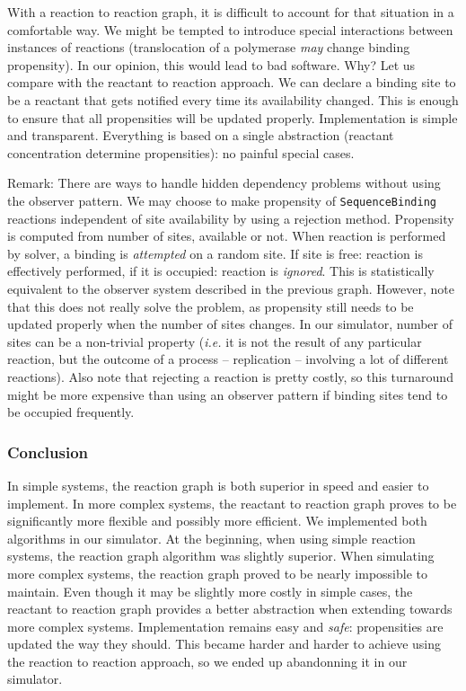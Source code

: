 With a reaction to reaction graph, it is difficult to account for that situation in a comfortable way. We might be tempted to introduce special interactions between instances of reactions (translocation of a polymerase \emph{may} change binding propensity). In our opinion, this would lead to bad software. Why? Let us compare with the reactant to reaction approach. We can declare a binding site to be a reactant that gets notified every time its availability changed. This is enough to ensure that all propensities will be updated properly. Implementation is simple and transparent. Everything is based on a single abstraction (reactant concentration determine propensities): no painful special cases.

\begin{footnotesize}
  Remark: There are ways to handle hidden dependency problems without using the observer pattern. We may choose to make propensity of \texttt{SequenceBinding} reactions independent of site availability by using a rejection method. Propensity is computed from number of sites, available or not. When reaction is performed by solver, a binding is \emph{attempted} on a random site. If site is free: reaction is effectively performed, if it is occupied: reaction is \emph{ignored}. This is statistically equivalent to the observer system described in the previous graph. However, note that this does not really solve the problem, as propensity still needs to be updated properly when the number of sites changes. In our simulator, number of sites can be a non-trivial property (\textit{i.e.} it is not the result of any particular reaction, but the outcome of a process -- replication -- involving a lot of different reactions). Also note that rejecting a reaction is pretty costly, so this turnaround might be more expensive than using an observer pattern if binding sites tend to be occupied frequently.
\end{footnotesize}

\subsubsection{Conclusion}

In simple systems, the reaction graph is both superior in speed and easier to implement. In more complex systems, the reactant to reaction graph proves to be significantly more flexible and possibly more efficient. We implemented both algorithms in our simulator. At the beginning, when using simple reaction systems, the reaction graph algorithm was slightly superior. When simulating more complex systems, the reaction graph proved to be nearly impossible to maintain. Even though it may be slightly more costly in simple cases, the reactant to reaction graph provides a better abstraction when extending towards more complex systems. Implementation remains easy and \emph{safe}: propensities are updated the way they should. This became harder and harder to achieve using the reaction to reaction approach, so we ended up abandonning it in our simulator.
